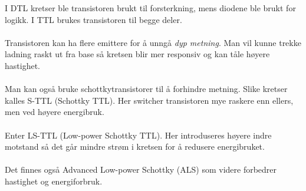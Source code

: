 I DTL kretser ble transistoren brukt til forsterkning, mens diodene ble
brukt for logikk.
I TTL brukes transistoren til begge deler.
\\\\
Transistoren kan ha flere emittere for å unngå \emph{dyp metning}.
Man vil kunne trekke ladning raskt ut fra base så kretsen blir mer responsiv
og kan tåle høyere hastighet.
\\\\
Man kan også bruke schottkytransistorer til å forhindre metning.
Slike kretser kalles S-TTL (Schottky TTL).
Her switcher transistoren mye raskere enn ellers, men ved høyere energibruk.
\\\\
Enter LS-TTL (Low-power Schottky TTL).
Her introduseres høyere indre motstand så det går mindre strøm i kretsen for
å redusere energibruket.
\\\\
Det finnes også Advanced Low-power Schottky (ALS) som videre forbedrer
hastighet og energiforbruk.
